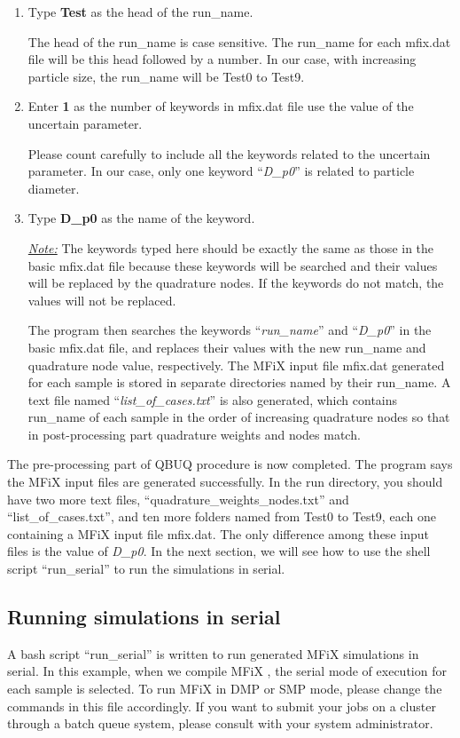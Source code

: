 \documentclass[a4paper,12pt,titlepage]{article}
\newcommand{\MFIX}{MFiX }
\begin{document}
\begin{enumerate}[resume,leftmargin=0cm,itemindent=0.5cm]
 \item Type \textbf{Test} as the head of the run\_name.
 
 The head of the run\_name is case sensitive. The run\_name for each mfix.dat 
 file will be this head followed by a number. In our case, with increasing 
 particle size, the run\_name will be Test0 to Test9.
 
 \item Enter \textbf{1} as the number of keywords in mfix.dat file use the value
 of the uncertain parameter.
 
 Please count carefully to include all the keywords related to the uncertain 
 parameter. In our case, only one keyword ``\emph{D\_p0}'' is related to 
 particle diameter.
 
 \item Type \textbf{D\_p0} as the name of the keyword.
 
 \emph{\underline{Note:}} The keywords typed here should be exactly the same 
 as those in the basic mfix.dat file because these keywords will be searched 
 and their values will be replaced by the quadrature nodes. If the keywords 
 do not match, the values will not be replaced.
 
The program then searches the keywords ``\emph{run\_name}'' and ``\emph{D\_p0}''
in the basic mfix.dat file, and replaces their values with the new run\_name and
quadrature node value, respectively. The \MFIX input file mfix.dat generated for
each sample is stored in separate directories named by their run\_name. A text
file named ``\emph{list\_of\_cases.txt}'' is also generated, which contains
run\_name of each sample in the order of increasing quadrature nodes so that in
post-processing part quadrature weights and nodes match. \end{enumerate}

The pre-processing part of QBUQ procedure is now completed. The program says the
\MFIX input files are generated successfully. In the run directory, you should
have two more text files, ``quadrature\_weights\_nodes.txt'' and
``list\_of\_cases.txt'', and ten more folders named from Test0 to Test9, each
one containing a \MFIX input file mfix.dat. The only difference among these input
files is the value of \emph{D\_p0}. In the next section, we will see how to use
the shell script ``run\_serial'' to run the simulations in serial.

\subsection{Running simulations in serial}
\label{sec:RunSerial}
A bash script ``run\_serial'' is written to run generated \MFIX simulations in
serial. In this example, when we compile \MFIX, the serial mode of execution for
each sample is selected. To run \MFIX in DMP or SMP mode, please change the
commands in this file accordingly. If you want to submit your jobs on a cluster
through a batch queue system, please consult with your system administrator.
\end{document}
